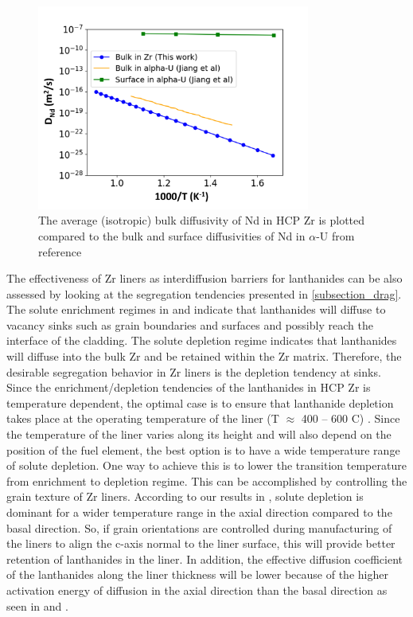 \documentclass[preprint,12pt]{elsarticle}
\begin{document}
\begin{figure}[h!]
    \centering
    \includegraphics[width=0.8\textwidth]{nd_diff_zr_vs_alphaU_updated.jpg}
    \caption{The average (isotropic) bulk diffusivity of Nd in HCP Zr is plotted compared to the bulk and surface diffusivities of Nd in $\alpha$-U from reference \cite{jiang_bulk_2021}}
    \label{fig:nd_av_diff_alphaU}
\end{figure}
\FloatBarrier

The effectiveness of Zr liners as interdiffusion barriers for lanthanides can be also assessed by looking at the segregation tendencies presented in \cref{subsection_drag}. The solute enrichment regimes in  and  indicate that lanthanides will diffuse to vacancy sinks such as grain boundaries and surfaces and possibly reach the interface of the cladding. The solute depletion regime indicates that lanthanides will diffuse into the bulk Zr and be retained within the Zr matrix. Therefore, the desirable segregation behavior in Zr liners is the depletion tendency at sinks.
Since the enrichment/depletion tendencies of the lanthanides in HCP Zr is temperature dependent, the optimal case is to ensure that lanthanide depletion takes place at the operating temperature of the liner (T $\approx$ 400 -- 600 C) \cite{beausoleil_fast_2022}. Since the temperature of the liner varies along its height and will also depend on the position of the fuel element, the best option is to have a wide temperature range of solute depletion. One way to achieve this is to lower the transition temperature from enrichment to depletion regime. This can be accomplished by controlling the grain texture of Zr liners. According to our results in , solute depletion is dominant for a wider temperature range in the axial direction compared to the basal direction. So, if grain orientations are controlled during manufacturing of the liners to align the c-axis normal to the liner surface, this will provide better retention of lanthanides in the liner. In addition, the effective diffusion coefficient of the lanthanides along the liner thickness will be lower because of the higher activation energy of diffusion in the axial direction than the basal direction as seen in  and .
\end{document}
